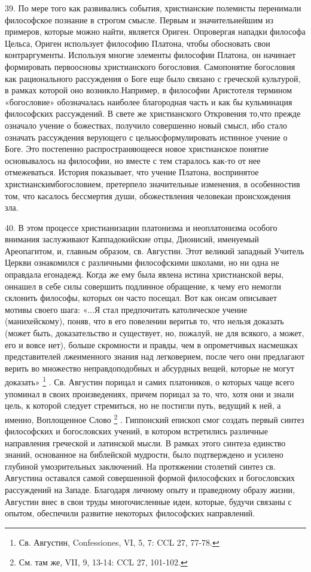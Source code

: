 \documentclass[a5paper,10pt]{article}
\begin{document}
39. По мере того как развивались события, христианские полемисты перенимали
философское познание в строгом смысле. Первым и значительнейшим из примеров,
которые можно найти, является Ориген. Опровергая нападки философа Цельса,
Ориген использует философию Платона, чтобы обосновать свои контраргументы.
Используя многие элементы философии Платона, он начинает формировать
первоосновы христианского богословия. Самопонятие богословия как рационального
рассуждения о Боге еще было связано с греческой культурой, в рамках которой оно
возникло.Например, в философии Аристотеля термином «богословие» обозначалась
наиболее благородная часть и как бы кульминация философских рассуждений. В
свете же христианского Откровения то,что прежде означало учение о божествах,
получило совершенно новый смысл, ибо стало означать рассуждения верующего с
цельюсформулировать истинное учение о Боге. Это постепенно распространяющееся
новое христианское понятие основывалось на философии, но вместе с тем старалось
как-то от нее отмежеваться. История показывает, что учение Платона, воспринятое
христианскимбогословием, претерпело значительные изменения, в особенностив том,
что касалось бессмертия души, обожествления человекаи происхождения зла.

40. В этом процессе христианизации платонизма и неоплатонизма особого внимания
заслуживают Каппадокийские отцы, Дионисий, именуемый Ареопагитом, и, главным
образом, св. Августин. Этот великий западный Учитель Церкви ознакомился с
различными философскими школами, но ни одна не оправдала егонадежд. Когда же
ему была явлена истина христианской веры, оннашел в себе силы совершить
подлинное обращение, к чему его немогли склонить философы, которых он часто
посещал. Вот как онсам описывает мотивы своего шага: «...Я стал предпочитать
католическое учение (манихейскому), поняв, что в его повелении веритьв то, что
нельзя доказать (может быть, доказательство и существует, но, пожалуй, не для
всякого, а может, его и вовсе нет), больше скромности и правды, чем в
опрометчивых насмешках представителей лжеименного знания над легковерием, после
чего они предлагают верить во множество неправдоподобных и абсурдных вещей,
которые не могут доказать» \footnote{Св. Августин, Confessiones, VI, 5, 7: CCL
27, 77-78.}  . Св. Августин порицал и самих платоников, о которых чаще всего
упоминал в своих произведениях, причем порицал за то, что, хотя они и знали
цель, к которой следует стремиться, но не постигли путь, ведущий к ней, а
именно, Воплощенное Слово \footnote{См. там же, VII, 9, 13-14: CCL 27,
101-102.} . Гиппонский епископ смог создать первый синтез философских и
богословских учений, в котором встретились различные направления греческой и
латинской мысли. В рамках этого синтеза единство знаний, основанное на
библейской мудрости, было подтверждено и усилено глубиной умозрительных
заключений. На протяжении столетий синтез св. Августина оставался самой
совершенной формой философских и богословских рассуждений на Западе. Благодаря
личному опыту и праведному образу жизни, Августин внес в свои труды
многочисленные идеи, которые, будучи связаны с опытом, обеспечили развитие
некоторых философских направлений.
\end{document}
